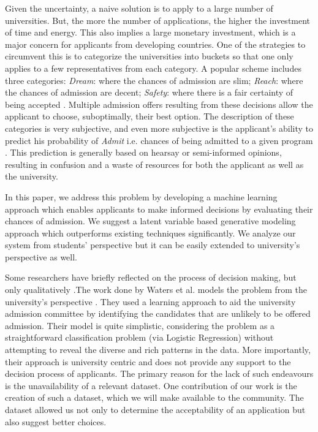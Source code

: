\documentclass{sig-alternate-05-2015}
\begin{document}
Given the uncertainty, a naive solution is to apply to a large number of universities. But, the more the number of applications, the higher the investment of time and energy. This also implies a large monetary investment, which is a major concern for applicants from developing countries. One of the strategies to circumvent this is to categorize the universities into buckets so that one only applies to a few representatives from each category. A popular scheme includes three categories: \textit{Dream}: where the chances of admission are slim; \textit{Reach}: where the chances of admission are decent; \textit{Safety}: where there is a fair certainty of being accepted \cite{sushnytimes}. Multiple admission offers resulting from these decisions allow the applicant to choose, suboptimally, their best option. The description of these categories is very subjective, and even more subjective is the applicant's ability to predict his probability of \textit{Admit} i.e. chances of being admitted to a given program \cite{sushnytimes}. This prediction is generally based on hearsay or semi-informed opinions, resulting in confusion and a waste of resources for both the applicant as well as the university.

In this paper, we address this problem by developing a machine learning approach which enables applicants to make informed decisions by evaluating their chances of admission. We suggest a latent variable based generative modeling approach which outperforms existing techniques significantly. We analyze our system from students' perspective but it can be easily extended to university's perspective as well.

Some researchers have briefly reflected on the process of decision making, but only qualitatively \cite{dagap}.The work done by Waters et al. models the problem from the university's perspective \cite{waters:iaai13}. They used a learning approach to aid the university admission committee by identifying the candidates that are unlikely to be offered admission. Their model is quite simplistic, considering the problem as a straightforward classification problem (via Logistic Regression) without attempting to reveal the diverse and rich patterns in the data. More importantly, their approach is university centric and does not provide any support to the decision process of applicants. The primary reason for the lack of such endeavours is the unavailability of a relevant dataset. One contribution of our work is the creation of such a dataset, which we will make available to the community. The dataset allowed us not only to determine the acceptability of an application but also suggest better choices.
\end{document}
